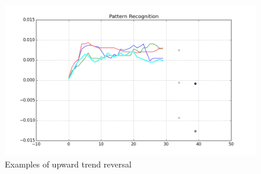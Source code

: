 \documentclass{article}
\begin{document}
\begin{figure}[h!]
\begin{center}
        \includegraphics[scale=0.3]{figure_3}
        \caption{Examples of upward trend reversal}
\end{center}
\end{figure}
\end{document}
